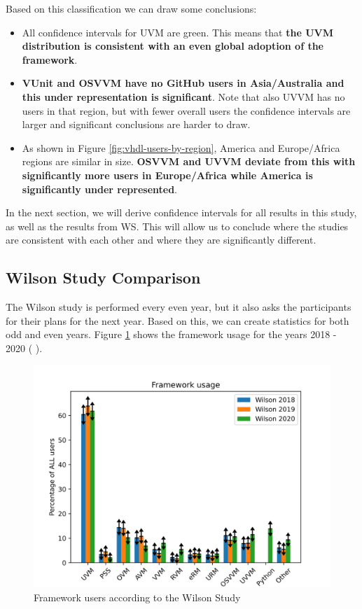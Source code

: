 \documentclass[]{article}
\providecommand{\tightlist}{%
  \setlength{\itemsep}{0pt}\setlength{\parskip}{0pt}}
\begin{document}
Based on this classification we can draw some conclusions:

\begin{itemize}
\tightlist
\item
  All confidence intervals for UVM are green. This means that \textbf{the UVM distribution is consistent with an even global adoption of the framework}.
\item
  \textbf{VUnit and OSVVM have no GitHub users in Asia/Australia and this under representation is significant}. Note that also UVVM has no users in that region, but with fewer overall users the confidence intervals are larger and significant conclusions are harder to draw.
\item
  As shown in Figure \ref{fig:vhdl-users-by-region}, America and Europe/Africa regions are similar in size. \textbf{OSVVM and UVVM deviate from this with significantly more users in Europe/Africa while America is significantly under represented}.
\end{itemize}

In the next section, we will derive confidence intervals for all results in this study, as well as the results from WS. This will allow us to conclude where the studies are consistent with each other and where they are significantly different.

\hypertarget{wilson-study-comparison}{%
\subsection{Wilson Study Comparison}\label{wilson-study-comparison}}

The Wilson study is performed every even year, but it also asks the participants for their plans for the next year. Based on this, we can create statistics for both odd and even years. Figure \ref{fig:wilson-study-2018-2020} shows the framework usage for the years 2018 - 2020 (\autocite{wilson18} \autocite{wilson20}).

\begin{figure}

{\centering \includegraphics[width=0.85\linewidth]{img/wilson_study_2018_2020} 

}

\caption{Framework users according to the Wilson Study}\label{fig:wilson-study-2018-2020}
\end{figure}
\end{document}
